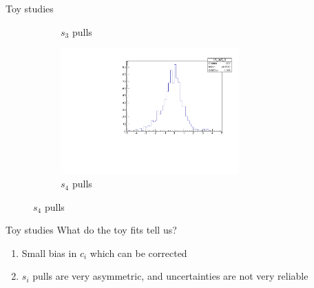 \documentclass{beamer}
\begin{document}
\begin{frame}{Toy studies}
\begin{figure}
\begin{subfigure}{0.5\textwidth}
      \caption{$s_3$ pulls}
    \end{subfigure}%
    \begin{subfigure}{0.5\textwidth}
      \centering
      \includegraphics[width=0.75\textwidth]{Plots/s4_ToyFits_pull.pdf}
      \caption{$s_4$ pulls}
    \end{subfigure}
  \end{figure}
\end{frame}

\begin{frame}{Toy studies}
  \vspace{0.0cm}
  {\Large What do the toy fits tell us?}
  \vspace{1.0cm}
  \begin{enumerate}
    \setlength\itemsep{2.0em}
    \item{Small bias in $c_i$ which can be corrected}
    \item{$s_i$ pulls are very asymmetric, and uncertainties are not very reliable}
  \end{enumerate}
\end{frame}
\end{document}
